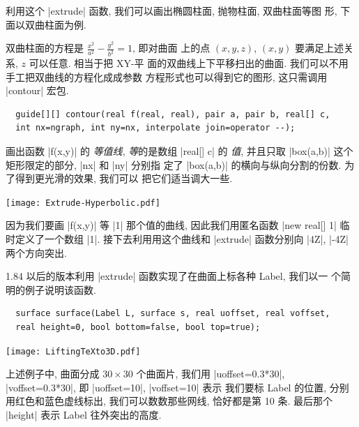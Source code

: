 \documentclass[nofonts,CJKnormalspaces]{ctexbook}[2009/05/20]
\begin{document}
利用这个 |extrude| 函数, 我们可以画出椭圆柱面, 抛物柱面, 双曲柱面等图
形, 下面以双曲柱面为例.

双曲柱面的方程是 $\frac{x^{2}}{a^{2}}-\frac{y^{2}}{b^{2}}=1$, 即对曲面
上的点 $(x,y,z)$, $(x,y)$ 要满足上述关系, $z$ 可以任意. 相当于把 XY-平
面的双曲线上下平移扫出的曲面. 我们可以不用手工把双曲线的方程化成成参数
方程形式也可以得到它的图形, 这只需调用 |contour| 宏包.
\begin{lstlisting}
  guide[][] contour(real f(real, real), pair a, pair b, real[] c,
  int nx=ngraph, int ny=nx, interpolate join=operator --);
\end{lstlisting}
画出函数 |f(x,y)| 的 \emph{等值线}, \emph{等}的是数组 |real[] c| 的
\emph{值}, 并且只取 |box(a,b)| 这个矩形限定的部分, |nx| 和 |ny| 分别指
定了 |box(a,b)| 的横向与纵向分割的份数. 为了得到更光滑的效果, 我们可以
把它们适当调大一些.
\begin{center}\texttt{[image: Extrude-Hyperbolic.pdf]}\end{center}%

因为我们要画 |f(x,y)| 等 |1| 那个值的曲线, 因此我们用匿名函数
|new real[] {1}| 临时定义了一个数组 |{1}|. 接下去利用用这个曲线和 |extrude|
函数分别向 |4Z|, |-4Z| 两个方向突出.

1.84 以后的版本利用 |extrude| 函数实现了在曲面上标各种 Label, 我们以一
个简明的例子说明该函数.
\begin{lstlisting}
  surface surface(Label L, surface s, real uoffset, real voffset,
  real height=0, bool bottom=false, bool top=true);
\end{lstlisting}
\begin{center}\texttt{[image: LiftingTeXto3D.pdf]}\end{center}%

上述例子中, 曲面分成 $30\times 30$ 个曲面片, 我们用
|uoffset=0.3*30|, |voffset=0.3*30|, 即 |uoffset=10|, |voffset=10| 表示
我们要标 Label 的位置, 分别用红色和蓝色虚线标出, 我们可以数数那些网线,
恰好都是第 10 条. 最后那个 |height| 表示 Label 往外突出的高度.
\end{document}
